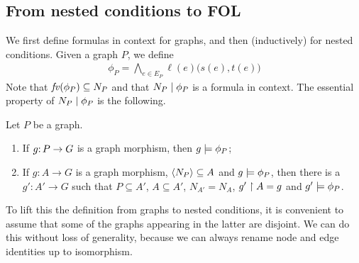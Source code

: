 \subsection{From nested conditions to FOL}

We first define formulas in context for graphs, and then (inductively) for nested conditions. Given a graph $P$, we define
\begin{align}
	\phi_P = \textstyle
 \bigwedge_{e\in E_P} \ell(e)\bigl(s(e),t(e)\bigr)\label{eq:phiP}
\end{align}
%
Note that $\mathit{fv}(\phi_P)\subseteq N_P$ and that ${N_P} \mid {\phi_P}$ is a formula in context. The essential property of ${N_P} \mid {\phi_P}$ is the following.
%
\begin{proposition}\label{prop:graph formula}
Let $P$ be a graph.
\begin{enumerate}
\item If $g{:}\, P\rightarrow G$ is a graph morphism, then $g\models \phi_P$;
\item If $g:A\to G$ is a graph morphism, $\langle N_P\rangle \subseteq A$ and $g\models \phi_P$, then there is a $g': A' \to G$ such that $P \subseteq A'$, $A \subseteq A'$, $N_{A'} = N_A$, $g' \restriction A = g$ and $g' \models \phi_P$.
\end{enumerate}
\end{proposition}
%

To lift this the definition from graphs to nested conditions, it is convenient to assume that some of the graphs appearing in the latter are disjoint. We can do this without loss of generality, because we can always rename node and edge identities up to isomorphism.

